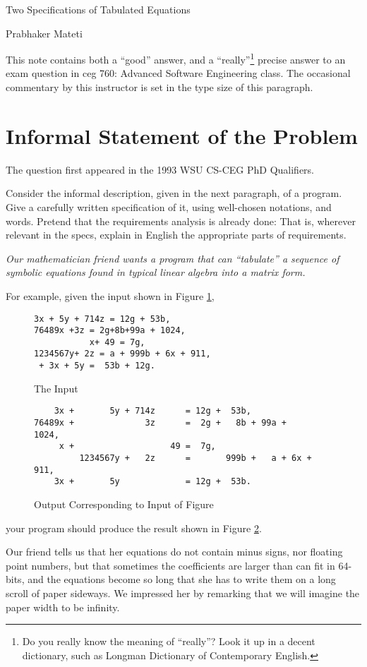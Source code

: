 \documentclass[12pt]{article}
\begin{document}
{\centering
{\Large Two Specifications of Tabulated Equations\\[5pt]}

Prabhaker Mateti\\
}

\bigskip

{\small This note contains both a ``good''  answer, and
a ``really''\footnote{Do you really know the meaning of ``really''?
Look it up in a decent dictionary, such as Longman Dictionary
of Contemporary English.}
precise answer to an exam question in {\sc ceg} 760: Advanced
Software Engineering class.  The occasional commentary by this
instructor is set in the type size of this paragraph.  }

\section{Informal Statement of the Problem}

{\small The question first appeared in the 1993 WSU CS-CEG PhD
Qualifiers.}

Consider the informal description, given in the next paragraph, of a
program.  Give a carefully written specification of it, using
well-chosen notations, and words.  Pretend that the requirements
analysis is already done: That is, wherever relevant in the specs,
explain in English the appropriate parts of requirements.

{\sl
\parindent=0pt
Our mathematician friend wants a program that can ``tabulate'' a
sequence of symbolic equations found in typical linear algebra into a
matrix form.

For example, given the input shown in Figure \ref{inp},

\begin{figure}[hb]
\begin{verbatim}
3x + 5y + 714z = 12g + 53b,
76489x +3z = 2g+8b+99a + 1024,
           x+ 49 = 7g,
1234567y+ 2z = a + 999b + 6x + 911,
 + 3x + 5y =  53b + 12g.
\end{verbatim}
\caption{The Input}
\label{inp}
\end{figure}


\begin{figure}
\begin{verbatim}
    3x +       5y + 714z      = 12g +  53b,
76489x +              3z      =  2g +   8b + 99a +      1024,
     x +                   49 =  7g,
         1234567y +   2z      =       999b +   a + 6x +  911,
    3x +       5y             = 12g +  53b.
\end{verbatim}
\caption{Output Corresponding to Input of Figure \protect{\ref{inp}} }
\label{out}
\end{figure}

your program should produce the result shown in Figure \ref{out}.


\noindent  Our friend  tells us that her equations do not contain
minus signs, nor floating point numbers, but that sometimes the
coefficients are larger than can fit in 64-bits, and the equations
become so long that she has to write them on a long scroll of paper
sideways.  We impressed her by remarking that we will imagine the
paper width to be infinity.
}
\end{document}
